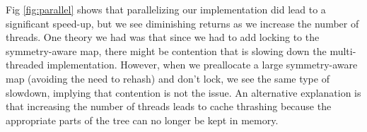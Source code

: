Fig \ref{fig:parallel} shows that parallelizing our implementation did lead to a significant speed-up, but we see diminishing returns as we increase the number of threads.
One theory we had was that since we had to add locking to the symmetry-aware map, there might be contention that is slowing down the multi-threaded implementation.
However, when we preallocate a large symmetry-aware map (avoiding the need to rehash) and don't lock, we see the same type of slowdown, implying that contention is not the issue.
An alternative explanation is that increasing the number of threads leads to cache thrashing because the appropriate parts of the tree can no longer be kept in memory.